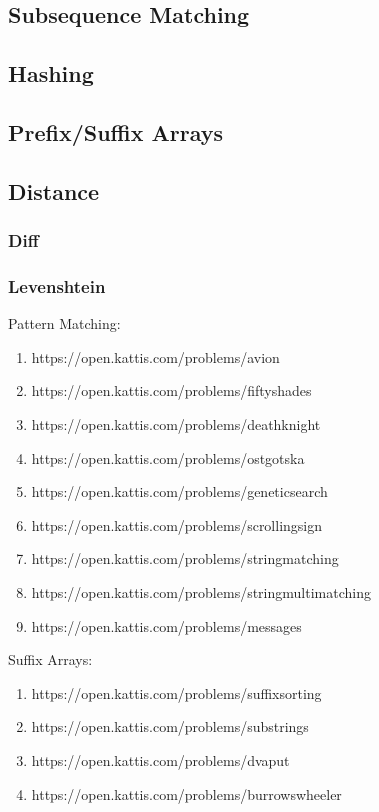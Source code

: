 \subsection{Subsequence Matching}
\subsection{Hashing}
\subsection{Prefix/Suffix Arrays}
\subsection{Distance}
\subsubsection{Diff}
\subsubsection{Levenshtein}

\hrulefill

Pattern Matching:
\begin{enumerate}
\item https://open.kattis.com/problems/avion
\item https://open.kattis.com/problems/fiftyshades
\item https://open.kattis.com/problems/deathknight
\item https://open.kattis.com/problems/ostgotska
\item https://open.kattis.com/problems/geneticsearch
\item https://open.kattis.com/problems/scrollingsign
\item https://open.kattis.com/problems/stringmatching
\item https://open.kattis.com/problems/stringmultimatching
\item https://open.kattis.com/problems/messages
\end{enumerate}

Suffix Arrays:
\begin{enumerate}
\item https://open.kattis.com/problems/suffixsorting
\item https://open.kattis.com/problems/substrings
\item https://open.kattis.com/problems/dvaput
\item https://open.kattis.com/problems/burrowswheeler
\end{enumerate}
